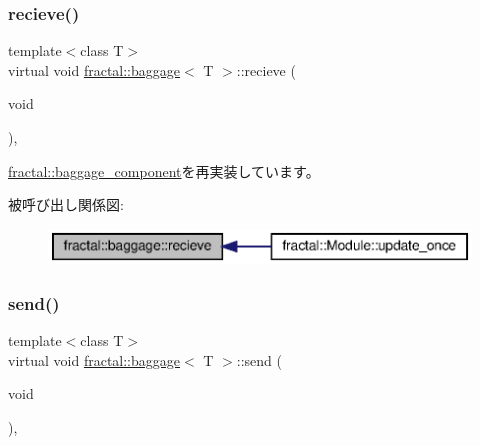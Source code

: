 \mbox{\label{classfractal_1_1baggage_aa7d07fc98f7c76789e6047345b2119ce}} 
\subsubsection{\texorpdfstring{recieve()}{recieve()}}
{\footnotesize\ttfamily template$<$class T$>$ \\
virtual void \hyperlink{classfractal_1_1baggage}{fractal\+::baggage}$<$ T $>$\+::recieve (\begin{DoxyParamCaption}\item[{void}]{ }\end{DoxyParamCaption})\hspace{0.3cm}{\ttfamily [inline]}, {\ttfamily [virtual]}}



\hyperlink{classfractal_1_1baggage__component_a37ef357c567ca8844d1b83c83e86df74}{fractal\+::baggage\+\_\+component}を再実装しています。

被呼び出し関係図\+:
\nopagebreak
\begin{figure}[H]
\begin{center}
\leavevmode
\includegraphics[width=347pt]{classfractal_1_1baggage_aa7d07fc98f7c76789e6047345b2119ce_icgraph}
\end{center}
\end{figure}
\mbox{\label{classfractal_1_1baggage_a12ef96c1b906369cfeeabdead61c257b}} 
\subsubsection{\texorpdfstring{send()}{send()}}
{\footnotesize\ttfamily template$<$class T$>$ \\
virtual void \hyperlink{classfractal_1_1baggage}{fractal\+::baggage}$<$ T $>$\+::send (\begin{DoxyParamCaption}\item[{void}]{ }\end{DoxyParamCaption})\hspace{0.3cm}{\ttfamily [inline]}, {\ttfamily [virtual]}}



